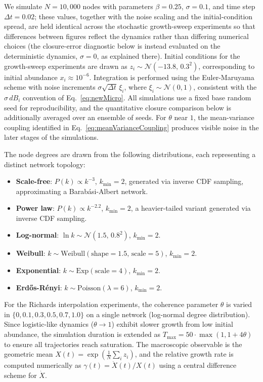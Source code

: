 \documentclass{article}
\begin{document}
We simulate $N = 10{,}000$ nodes with parameters $\beta = 0.25$, $\sigma = 0.1$, and time step $\Delta t = 0.02$; these values, together with the noise scaling and the initial-condition spread, are held identical across the stochastic growth-sweep experiments so that differences between figures reflect the dynamics rather than differing numerical choices (the closure-error diagnostic below is instead evaluated on the deterministic dynamics, $\sigma = 0$, as explained there). Initial conditions for the growth-sweep experiments are drawn as $z_i \sim \mathcal{N}(-13.8, \, 0.3^2)$, corresponding to initial abundance $x_i \approx 10^{-6}$. Integration is performed using the Euler-Maruyama scheme with noise increments $\sigma\sqrt{\Delta t}\, \xi_i$, where $\xi_i \sim \mathcal{N}(0,1)$, consistent with the $\sigma\,dB_i$ convention of Eq.\ \ref{eq:newMicro}. All simulations use a fixed base random seed for reproducibility, and the quantitative closure comparison below is additionally averaged over an ensemble of seeds. For $\theta$ near $1$, the mean-variance coupling identified in Eq.\ \ref{eq:meanVarianceCoupling} produces visible noise in the later stages of the simulations.

The node degrees are drawn from the following distributions, each representing a distinct network topology:

\begin{itemize}
\item \textbf{Scale-free}: $P(k) \propto k^{-3}$, $k_{\min} = 2$, generated via inverse CDF sampling, approximating a Barab\'{a}si-Albert network.
\item \textbf{Power law}: $P(k) \propto k^{-2.2}$, $k_{\min} = 2$, a heavier-tailed variant generated via inverse CDF sampling.
\item \textbf{Log-normal}: $\ln k \sim \mathcal{N}(1.5, \, 0.8^2)$, $k_{\min} = 2$.
\item \textbf{Weibull}: $k \sim \text{Weibull}(\text{shape}=1.5, \, \text{scale}=5)$, $k_{\min} = 2$.
\item \textbf{Exponential}: $k \sim \text{Exp}(\text{scale}=4)$, $k_{\min} = 2$.
\item \textbf{Erd\H{o}s-R\'{e}nyi}: $k \sim \text{Poisson}(\lambda = 6)$, $k_{\min} = 2$.
\end{itemize}

For the Richards interpolation experiments, the coherence parameter $\theta$ is varied in $\{0, 0.1, 0.3, 0.5, 0.7, 1.0\}$ on a single network (log-normal degree distribution). Since logistic-like dynamics ($\theta \to 1$) exhibit slower growth from low initial abundance, the simulation duration is extended as $T_{\max} = 50 \cdot \max(1, 1 + 4\theta)$ to ensure all trajectories reach saturation. The macroscopic observable is the geometric mean $X(t) = \exp(\frac{1}{N}\sum_i z_i)$, and the relative growth rate is computed numerically as $\gamma(t) = \dot{X}(t) / X(t)$ using a central difference scheme for $\dot{X}$.
\end{document}
